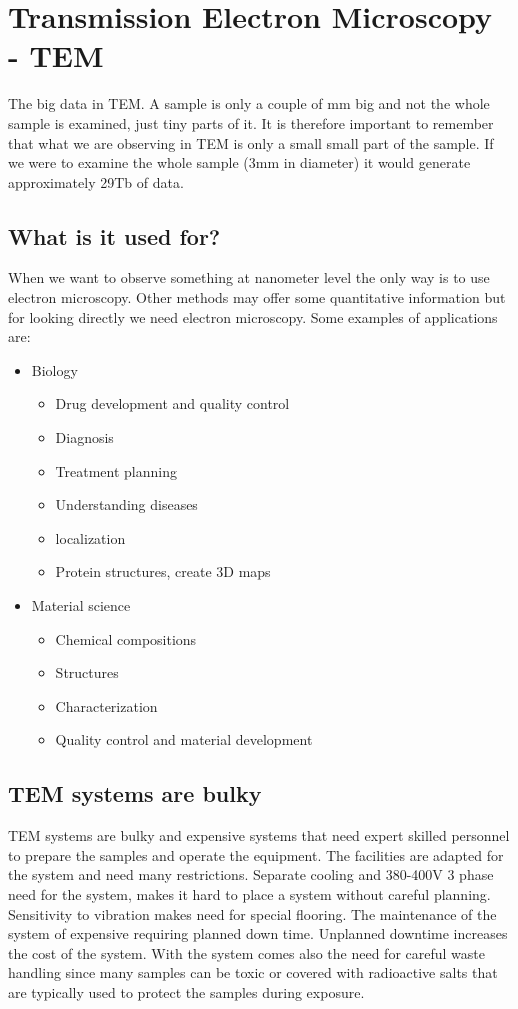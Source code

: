 \section{Transmission Electron Microscopy - TEM}
The big data in TEM. A sample is only a couple of mm big and not the whole sample is examined, just tiny parts of it. It is therefore important to remember that what we are observing in TEM is only a small small part of the sample. If we were to examine the whole sample (3mm in diameter) it would generate approximately 29Tb of data. 

	\subsection{What is it used for?}
	When we want to observe something at nanometer level the only way is to use electron microscopy. Other methods may offer some quantitative information but for looking directly we need electron microscopy. Some examples of applications are:

	\begin{itemize}
		\item Biology \begin{itemize}
			\item Drug development and quality control
					\item Diagnosis
					\item Treatment planning
					\item Understanding diseases
					\item localization
					\item Protein structures, create 3D maps
		\end{itemize}
		\item Material science \begin{itemize}
					\item Chemical compositions
					\item Structures
					\item Characterization
					\item Quality control and material development
		\end{itemize}
	\end{itemize}

	\subsection{TEM systems are bulky}
	TEM systems are bulky and expensive systems that need expert skilled personnel to prepare the samples and operate the equipment. The facilities are adapted for the system and need many restrictions. Separate cooling and 380-400V 3 phase need for the system, makes it hard to place a system without careful planning. Sensitivity to vibration makes need for special flooring. The maintenance  of the system of expensive requiring planned down time. Unplanned downtime increases the cost of the system. With the system comes also the need for careful waste handling since many samples can be toxic or covered with radioactive salts that are typically used to protect the samples during exposure. 


